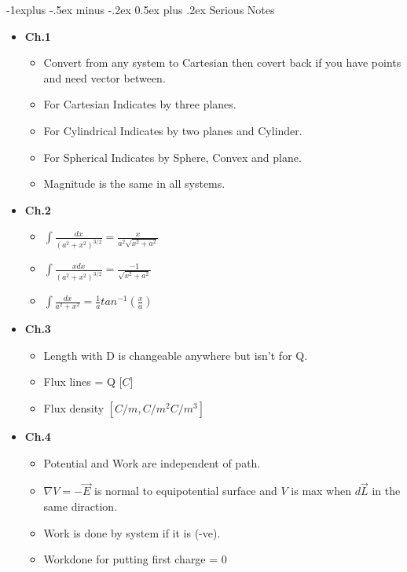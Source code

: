 \documentclass[10pt,landscape]{article}
\makeatletter
\renewcommand{\subsection}{\@startsection{subsection}{2}{0mm}%
                                {-1explus -.5ex minus -.2ex}%
                                {0.5ex plus .2ex}%
                                {\normalfont\normalsize\bfseries}}
\makeatother
\begin{document}
\begin{multicols*}{3}
\subsection{Serious Notes}
\begin{itemize}
    \item \textbf{Ch.1}
    \begin{itemize}
        \item Convert from any system to Cartesian then covert back if you have points and need vector between.
        \item For Cartesian Indicates by three planes. \item For Cylindrical Indicates by two planes and Cylinder. \item For Spherical Indicates by Sphere, Convex and plane.
        \item Magnitude is the same in all systems.
    \end{itemize}
    \item \textbf{Ch.2}
    \begin{itemize}
                \item $\int \frac{dx}{(a^2 + x^2)^{3/2}} = \frac{x}{a^2\sqrt{x^2 + a^2}}$
                \item $\int \frac{x dx}{(a^2 + x^2)^{3/2}} = \frac{-1}{\sqrt{x^2 + a^2}}$
                \item $\int \frac{dx}{a^2 + x^2} = \frac{1}{a}tan^{-1}(\frac{x}{a})$
    \end{itemize}
    \item \textbf{Ch.3}
    \begin{itemize}
                \item Length with D is changeable anywhere but isn't for Q.
                \item Flux lines = Q [$C$]
                \item Flux density $[C/m, C/m^2 C/m^3]$
    \end{itemize}
    \item \textbf{Ch.4}
    \begin{itemize}
                \item Potential and Work are independent of path.
                \item $\nabla V = -\vec{E}$ is normal to equipotential surface and $V$ is max when $d\vec{L}$ in the same diraction.
                \item Work is done by system if it is (-ve).
                \item Workdone for putting first charge = 0

\end{itemize}
\end{itemize}
\end{multicols*}
\end{document}
